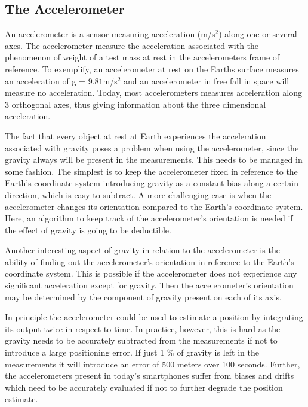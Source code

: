 \documentclass{LTHthesis}
\begin{document}
\subsection{The Accelerometer}
%
An accelerometer is a sensor measuring acceleration (m/s$^2$) along one or several axes. The accelerometer measure the acceleration associated with the phenomenon of weight of a test mass at rest in the accelerometers frame of reference. To exemplify, an accelerometer at rest on the Earths surface measures an acceleration of g = $9.81$m/s$^2$ and an accelerometer in free fall in space will measure no acceleration. Today, most accelerometers measures acceleration along 3 orthogonal axes, thus giving information about the three dimensional acceleration. 

The fact that every object at rest at Earth experiences the acceleration associated with gravity poses a problem when using the accelerometer, since the gravity always will be present in the measurements. This needs to be managed in some fashion. The simplest is to keep the accelerometer fixed in reference to the Earth's coordinate system introducing gravity as a constant bias along a certain direction, which is easy to subtract. A more challenging case is when the accelerometer changes its orientation compared to the Earth's coordinate system. Here, an algorithm to keep track of the accelerometer's orientation is needed if the effect of gravity is going to be deductible. 

Another interesting aspect of gravity in relation to the accelerometer is the ability of finding out the accelerometer's orientation in reference to the Earth's coordinate system. This is possible if the accelerometer does not experience any significant acceleration except for gravity. Then the accelerometer's orientation may be determined by the component of gravity present on each of its axis. 

In principle the accelerometer could be used to estimate a position by integrating its output twice in respect to time. In practice, however, this is hard as the gravity needs to be accurately subtracted from the measurements if not to introduce a large positioning error. If just 1 \% of gravity is left in the measurements it will introduce an error of  500 meters over 100 seconds. Further, the accelerometers present in today's smartphones suffer from biases and drifts which need to be accurately evaluated if not to further degrade the position estimate. 
%
\end{document}
